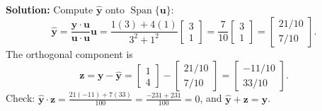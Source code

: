 \documentclass[11pt, letterpaper]{article}
\theoremstyle{definition}
\theoremstyle{remark}
\begin{document}
\textbf{Solution:} Compute $\hat{\mathbf{y}}$ onto $\operatorname{Span}\{\mathbf{u}\}$:
\[
\hat{\mathbf{y}} = \frac{\mathbf{y} \cdot \mathbf{u}}{\mathbf{u} \cdot \mathbf{u}}\mathbf{u} = \frac{1(3) + 4(1)}{3^2 + 1^2}\begin{bmatrix} 3 \\ 1 \end{bmatrix} = \frac{7}{10}\begin{bmatrix} 3 \\ 1 \end{bmatrix} = \begin{bmatrix} 21/10 \\ 7/10 \end{bmatrix}.
\]
The orthogonal component is
\[
\mathbf{z} = \mathbf{y} - \hat{\mathbf{y}} = \begin{bmatrix} 1 \\ 4 \end{bmatrix} - \begin{bmatrix} 21/10 \\ 7/10 \end{bmatrix} = \begin{bmatrix} -11/10 \\ 33/10 \end{bmatrix}.
\]
Check: $\hat{\mathbf{y}} \cdot \mathbf{z} = \frac{21(-11) + 7(33)}{100} = \frac{-231 + 231}{100} = 0$, and $\hat{\mathbf{y}} + \mathbf{z} = \mathbf{y}$.
\end{document}
